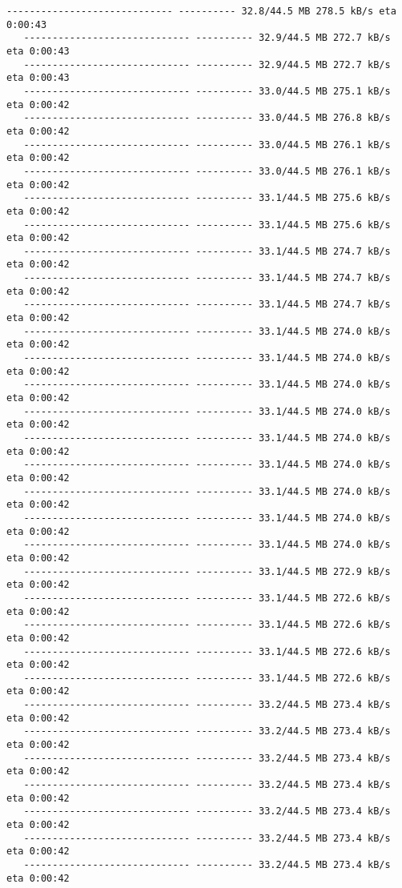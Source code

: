 \documentclass[11pt]{article}
\begin{document}
\begin{Verbatim}[commandchars=\\\{\}]
   ----------------------------- ---------- 32.8/44.5 MB 278.5 kB/s eta 0:00:43
   ----------------------------- ---------- 32.9/44.5 MB 272.7 kB/s eta 0:00:43
   ----------------------------- ---------- 32.9/44.5 MB 272.7 kB/s eta 0:00:43
   ----------------------------- ---------- 33.0/44.5 MB 275.1 kB/s eta 0:00:42
   ----------------------------- ---------- 33.0/44.5 MB 276.8 kB/s eta 0:00:42
   ----------------------------- ---------- 33.0/44.5 MB 276.1 kB/s eta 0:00:42
   ----------------------------- ---------- 33.0/44.5 MB 276.1 kB/s eta 0:00:42
   ----------------------------- ---------- 33.1/44.5 MB 275.6 kB/s eta 0:00:42
   ----------------------------- ---------- 33.1/44.5 MB 275.6 kB/s eta 0:00:42
   ----------------------------- ---------- 33.1/44.5 MB 274.7 kB/s eta 0:00:42
   ----------------------------- ---------- 33.1/44.5 MB 274.7 kB/s eta 0:00:42
   ----------------------------- ---------- 33.1/44.5 MB 274.7 kB/s eta 0:00:42
   ----------------------------- ---------- 33.1/44.5 MB 274.0 kB/s eta 0:00:42
   ----------------------------- ---------- 33.1/44.5 MB 274.0 kB/s eta 0:00:42
   ----------------------------- ---------- 33.1/44.5 MB 274.0 kB/s eta 0:00:42
   ----------------------------- ---------- 33.1/44.5 MB 274.0 kB/s eta 0:00:42
   ----------------------------- ---------- 33.1/44.5 MB 274.0 kB/s eta 0:00:42
   ----------------------------- ---------- 33.1/44.5 MB 274.0 kB/s eta 0:00:42
   ----------------------------- ---------- 33.1/44.5 MB 274.0 kB/s eta 0:00:42
   ----------------------------- ---------- 33.1/44.5 MB 274.0 kB/s eta 0:00:42
   ----------------------------- ---------- 33.1/44.5 MB 274.0 kB/s eta 0:00:42
   ----------------------------- ---------- 33.1/44.5 MB 272.9 kB/s eta 0:00:42
   ----------------------------- ---------- 33.1/44.5 MB 272.6 kB/s eta 0:00:42
   ----------------------------- ---------- 33.1/44.5 MB 272.6 kB/s eta 0:00:42
   ----------------------------- ---------- 33.1/44.5 MB 272.6 kB/s eta 0:00:42
   ----------------------------- ---------- 33.1/44.5 MB 272.6 kB/s eta 0:00:42
   ----------------------------- ---------- 33.2/44.5 MB 273.4 kB/s eta 0:00:42
   ----------------------------- ---------- 33.2/44.5 MB 273.4 kB/s eta 0:00:42
   ----------------------------- ---------- 33.2/44.5 MB 273.4 kB/s eta 0:00:42
   ----------------------------- ---------- 33.2/44.5 MB 273.4 kB/s eta 0:00:42
   ----------------------------- ---------- 33.2/44.5 MB 273.4 kB/s eta 0:00:42
   ----------------------------- ---------- 33.2/44.5 MB 273.4 kB/s eta 0:00:42
   ----------------------------- ---------- 33.2/44.5 MB 273.4 kB/s eta 0:00:42

\end{Verbatim}
\end{document}
